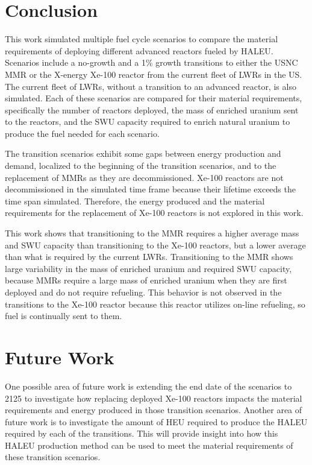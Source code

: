 \section{Conclusion}
This work simulated multiple fuel cycle scenarios to compare the 
material requirements of deploying different advanced reactors fueled 
by \gls{HALEU}. Scenarios include a no-growth and a 1\% growth 
transitions to either the \gls{USNC} \gls{MMR} or the X-energy Xe-100 
reactor from the current fleet of \glspl{LWR} in the US. The current 
fleet of \glspl{LWR}, without a transition to an advanced reactor, is 
also simulated. Each of these scenarios are compared for their material 
requirements, specifically the number of reactors deployed, the mass 
of enriched uranium sent to the reactors, and the \gls{SWU} capacity 
required to enrich natural uranium to produce the fuel needed for 
each scenario. 

The transition scenarios exhibit some gaps between  
energy production and demand, localized to the beginning of the 
transition
scenarios, and to the replacement of \glspl{MMR} as they are decommissioned. 
Xe-100 reactors are not decommissioned in the simulated time frame because 
their lifetime exceeds the time span simulated. Therefore, the 
energy produced and the material requirements for the replacement of 
Xe-100 reactors is not explored in this work. 

This work shows that transitioning to the \gls{MMR} requires 
a higher average mass and \gls{SWU} capacity than transitioning to the 
Xe-100 reactors, but a lower average than what is required by the current 
\glspl{LWR}. Transitioning to the \gls{MMR} shows large variability in 
the mass of enriched uranium and required \gls{SWU} capacity, because 
\glspl{MMR} require a large mass of enriched uranium when they are 
first deployed and do not require refueling. This behavior is not observed 
in the transitions to the Xe-100 reactor because this reactor utilizes 
on-line refueling, so fuel is continually sent to them. 

\section{Future Work}
One possible area of future work is extending the end date 
of the scenarios to 2125 to investigate how replacing deployed Xe-100 
reactors impacts the material requirements and energy produced in those 
transition scenarios. Another area of future work is to investigate the 
amount of \gls{HEU} required to produce the \gls{HALEU} required by 
each of the transitions. This will provide insight into how this \gls{HALEU}
production method can be used to meet the material requirements of these 
transition scenarios. 
